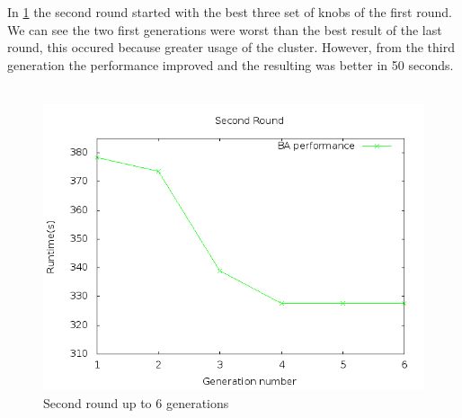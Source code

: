 In \ref{fig:6gen} the second round started with the best three set of knobs
of the first round. We can see the two first generations were worst than the best
result of the last round, this occured because greater usage of the cluster. However,
from the third generation the performance improved and the resulting was better
in 50 seconds.
\\
\\
\begin{figure}[htbp]
\begin{center}
	\includegraphics[scale=0.6]{graphics/img/6gen.png}
\caption{Second round up to 6 generations} \label{fig:6gen}
\end{center}
\end{figure}
\\
\\
\\
\\
\\
\\
\\
\\
\\
\\
\\
\\
\\
\\
\\
\\
\\

